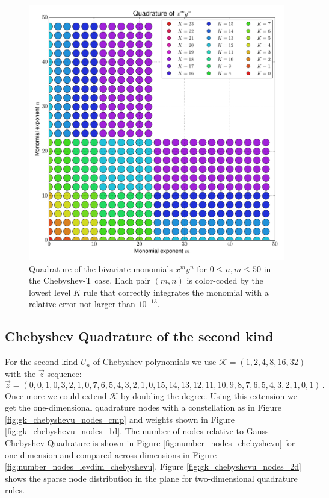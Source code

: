 \documentclass[a4paper,10pt]{article}
\begin{document}
\begin{figure}[h]
  \centering
  \includegraphics[width=\linewidth]{./img/monomial_errors_chebyshevt_2D.pdf}
  \caption{Quadrature of the bivariate monomials $x^m y^n$ for $0 \leq n, m \leq 50$
  in the Chebyshev-T case.
  Each pair $(m,n)$ is color-coded by the lowest level $K$ rule that correctly
  integrates the monomial with a relative error not larger than $10^{-13}$.}
  \label{fig:monomial_errors_chebyshevt_2D}
\end{figure}

\FloatBarrier
\subsection{Chebyshev Quadrature of the second kind}

For the second kind $U_n$ of Chebyshev polynomials we use
$\mathcal{K} = (1, 2, 4, 8, 16, 32)$ with the $\vec{z}$ sequence:
\begin{equation*}
  \vec{z} = (0, 0, 1, 0, 3, 2, 1, 0, 7, 6, 5, 4, 3, 2, 1, 0, 15, 14, 13, 12, 11,
             10, 9, 8, 7, 6, 5, 4, 3, 2, 1, 0, 1)\,.
\end{equation*}
Once more we could extend $\mathcal{K}$ by doubling the degree.
Using this extension we get the one-dimensional quadrature nodes
with a constellation as in Figure \ref{fig:gk_chebyshevu_nodes_cmp}
and weights shown in Figure \ref{fig:gk_chebyshevu_nodes_1d}.
The number of nodes relative to Gauss-Chebyshev Quadrature is shown
in Figure \ref{fig:number_nodes_chebyshevu} for one dimension and
compared across dimensions in Figure \ref{fig:number_nodes_levdim_chebyshevu}.
Figure \ref{fig:gk_chebyshevu_nodes_2d} shows the sparse
node distribution in the plane for two-dimensional quadrature rules.
\end{document}
